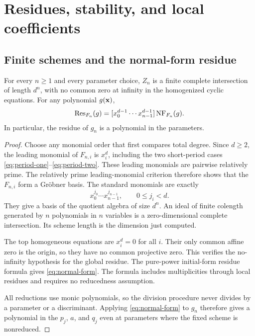 \section{Residues, stability, and local coefficients}\label{sec:residues}

\subsection{Finite schemes and the normal-form residue}

\begin{lemma}\label{lem:normal-form}
For every $n\ge1$ and every parameter choice, $Z_n$ is a finite complete
intersection of length $d^n$, with no common zero at infinity in the
homogenized cyclic equations. For any polynomial $g(\mathbf x)$,
\begin{equation}\label{eq:normal-form}
 \operatorname{Res}_{F_n}(g)=
 [x_0^{d-1}\cdots x_{n-1}^{d-1}]\operatorname{NF}_{F_n}(g).
\end{equation}
In particular, the residue of $g_n$ is a polynomial in the parameters.
\end{lemma}

\begin{proof}
Choose any monomial order that first compares total degree. Since
$d\ge2$, the leading monomial of $F_{n,i}$ is $x_i^d$, including the
two short-period cases \eqref{eq:period-one}--\eqref{eq:period-two}.
These leading monomials are pairwise relatively prime. The relatively
prime leading-monomial criterion therefore shows that the $F_{n,i}$
form a Gr\"obner basis. The standard monomials are exactly
\[
 x_0^{j_0}\cdots x_{n-1}^{j_{n-1}},\qquad 0\le j_i<d.
\]
They give a basis of the quotient algebra of size $d^n$. An ideal of
finite colength generated by $n$ polynomials in $n$ variables is a
zero-dimensional complete intersection. Its scheme length is the
dimension just computed.

The top homogeneous equations are $x_i^d=0$ for all $i$. Their only
common affine zero is the origin, so they have no common projective
zero. This verifies the no-infinity hypothesis for the global residue.
The pure-power initial-form residue formula
\citep[Lemma~4.2 of the author preprint]{cattani1996residues} gives
\eqref{eq:normal-form}. The formula includes multiplicities through
local residues and requires no reducedness assumption.

All reductions use monic polynomials, so the division procedure never
divides by a parameter or a discriminant. Applying
\eqref{eq:normal-form} to $g_n$ therefore gives a polynomial in the
$p_j$, $a$, and $q_j$ even at parameters where the fixed scheme is
nonreduced.
\end{proof}

